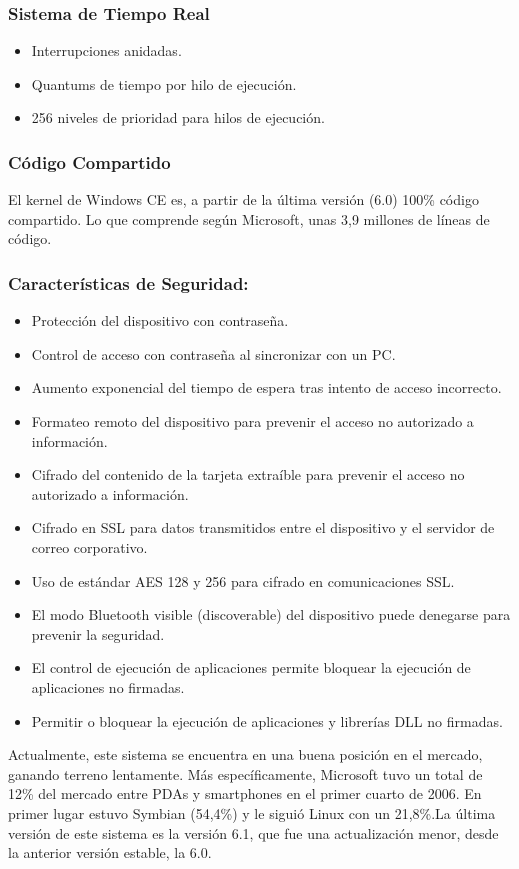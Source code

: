 \subsubsection*{Sistema de Tiempo Real}
\begin{itemize}
	\item Interrupciones anidadas.
	\item Quantums de tiempo por hilo de ejecución.
	\item 256 niveles de prioridad para hilos de ejecución.
\end{itemize}

\subsubsection*{Código Compartido}
El kernel de Windows CE es, a partir de la última versión (6.0) 100\% código compartido. Lo que comprende según Microsoft, unas 3,9 millones de líneas de código.

\subsubsection*{Características de Seguridad:}
\begin{itemize}
	\item Protección del dispositivo con contraseña.
	\item Control de acceso con contraseña al sincronizar con un PC.
	\item Aumento exponencial del tiempo de espera tras intento de acceso incorrecto.
	\item Formateo remoto del dispositivo para prevenir el acceso no autorizado a información.
	\item Cifrado del contenido de la tarjeta extraíble para prevenir el acceso no autorizado a información.
	\item Cifrado en SSL para datos transmitidos entre el dispositivo y el servidor de correo corporativo.
	\item Uso de estándar AES 128 y 256 para cifrado en comunicaciones SSL.
	\item El modo Bluetooth visible (discoverable) del dispositivo puede denegarse para prevenir la seguridad.
	\item El control de ejecución de aplicaciones permite bloquear la ejecución de aplicaciones no firmadas.
	\item Permitir o bloquear la ejecución de aplicaciones y librerías DLL no firmadas.   
\end{itemize}
Actualmente, este sistema se encuentra en una buena posición en el mercado, ganando terreno lentamente. Más específicamente, Microsoft tuvo un total de 12\% del mercado 
entre PDAs y smartphones en el primer cuarto de 2006. En primer lugar estuvo Symbian (54,4\%) y le siguió Linux con un 21,8\%.La última versión de este sistema es la 
versión 6.1, que fue una actualización menor, desde la anterior versión estable, la 6.0.

